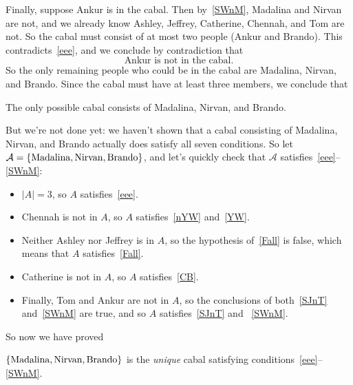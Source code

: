 \documentclass[12pt]{article}
\newcommand{\card}[1]{\left|#1\right|}
\begin{document}
{Finally, suppose Ankur is in the cabal.  Then by~\eqref{SWnM},
Madalina and Nirvan are not, and we already know Ashley, Jeffrey, Catherine,
Chennah, and Tom are not. So the cabal must consist of at most two
people (Ankur and Brando). This contradicts~\eqref{eee}, and we conclude
by contradiction that
\begin{equation}\label{nM}
\text{Ankur is not in the cabal.}
\end{equation}
So the only remaining people who could be in the cabal are Madalina,
Nirvan, and Brando.  Since the cabal must have at least three members,
we conclude that
\begin{lemma}
The only possible cabal consists of Madalina, Nirvan, and Brando.
\end{lemma}

But we're not done yet: we haven't shown that a cabal consisting of
Madalina, Nirvan, and Brando actually does satisfy all seven conditions.
So let $\mathcal{A} =\left\{\text{Madalina}, \text{Nirvan},
  \text{Brando}\right\}$, and let's quickly check that $\mathcal{A}$
satisfies~\eqref{eee}--\eqref{SWnM}:

\begin{itemize}

\item $\card{A} = 3$, so $A$ satisfies~\eqref{eee}.
\item Chennah is not in $A$, so $A$ satisfies~\eqref{nYW} and~\eqref{YW}.
\item Neither Ashley nor Jeffrey is in $A$, so the hypothesis
  of~\eqref{Fall} is false, which means that $A$
  satisfies~\eqref{Fall}.
\item Catherine is not in $A$, so $A$ satisfies~\eqref{CB}.
\item Finally, Tom and Ankur are not in $A$, so the conclusions of
both~\eqref{SJnT} and~\eqref{SWnM} are true, and so $A$
satisfies~\eqref{SJnT} and ~\eqref{SWnM}.

\end{itemize}

So now we have proved
\begin{proposition*}
$\left\{\text{Madalina}, \text{Nirvan}, \text{Brando}\right\}$ is the \emph{unique} cabal
satisfying conditions~\eqref{eee}--\eqref{SWnM}.
\end{proposition*}}
\end{document}
